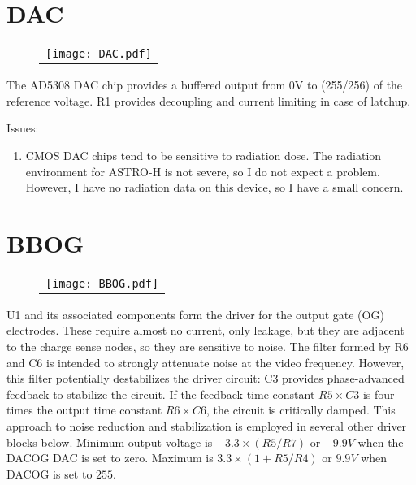 \documentclass[a4paper,10pt]{report}
\begin{document}
\section{DAC}
   \begin{figure}
   \begin{center}
   \begin{tabular}{c}
   \texttt{[image: DAC.pdf]}
   \end{tabular}
   \end{center}
   \end{figure}
The AD5308 DAC chip provides a buffered output from 0V to (255/256) of the reference voltage. R1 provides decoupling and current limiting in case of latchup.

Issues:
\begin{enumerate}
\item
CMOS DAC chips tend to be sensitive to radiation dose. The radiation environment for ASTRO-H is not severe, so I do not expect a problem. However, I have no radiation data on this device, so I have a small concern.
\end{enumerate}

\section{BBOG}

   \begin{figure}
   \begin{center}
   \begin{tabular}{c}
   \texttt{[image: BBOG.pdf]}
   \end{tabular}
   \end{center}
   \end{figure}
U1 and its associated components form the driver for the output gate (OG) electrodes. These require almost no current, only leakage, but they are adjacent to the charge sense nodes, so they are sensitive to noise. The filter formed by R6 and C6 is intended to strongly attenuate noise at the video frequency. However, this filter potentially destabilizes the driver circuit: C3 provides phase-advanced feedback to stabilize the circuit. If the feedback time constant $R5\times C3$ is four times the output time constant $R6\times C6$, the circuit is critically damped. This approach to noise reduction and stabilization is employed in several other driver blocks below.
Minimum output voltage is $-3.3\times(R5/R7)$ or $-9.9V$ when the DACOG DAC is set to zero. Maximum is $3.3\times(1+R5/R4)$ or $9.9V$ when DACOG is set to $255$.
\end{document}
